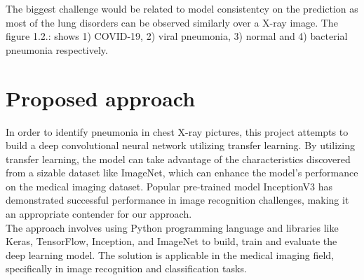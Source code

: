 The biggest challenge would be related to model consistentcy  on the prediction as most of the lung disorders can be observed similarly over a X-ray image. The figure 1.2.:  shows 1) COVID-19, 2) viral pneumonia, 3) normal and 4) bacterial pneumonia respectively.\\

\section{Proposed approach}

In order to identify pneumonia in chest X-ray pictures, this project attempts to build a deep convolutional neural network utilizing transfer learning. By utilizing transfer learning, the model can take advantage of the characteristics discovered from a sizable dataset like ImageNet, which can enhance the model's performance on the medical imaging dataset. Popular pre-trained model InceptionV3 has demonstrated successful performance in image recognition challenges, making it an appropriate contender for our approach.\\


The approach involves using Python programming language and libraries like Keras, TensorFlow, Inception, and ImageNet to build, train and evaluate the deep learning model. The solution is applicable in the medical imaging field, specifically in image recognition and classification tasks.\\